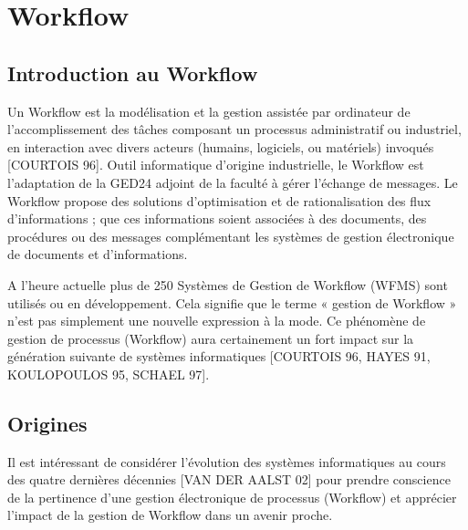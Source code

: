 
 \section{Workflow}
 	 
 	 \subsection{Introduction au Workflow }
 	 
 	 
 	 Un Workflow est la modélisation et la gestion assistée par ordinateur de l’accomplissement des tâches composant un processus administratif ou industriel, en interaction avec divers acteurs (humains, logiciels, ou matériels) invoqués [COURTOIS 96]. Outil informatique d’origine industrielle, le Workflow est l’adaptation de la GED24 adjoint de la faculté à gérer l’échange de messages. Le Workflow propose des solutions d’optimisation et de rationalisation des flux d’informations ; que ces informations soient associées à des documents, des procédures ou des messages complémentant les systèmes de gestion électronique de documents et d’informations.
 	 
 	 A l’heure actuelle plus de 250 Systèmes de Gestion de Workflow (WFMS) sont utilisés ou en développement. Cela signifie que le terme « gestion de Workflow » n’est pas simplement une nouvelle expression à la mode. Ce phénomène de gestion de processus (Workflow) aura certainement un fort impact sur la génération suivante de systèmes informatiques [COURTOIS 96, HAYES 91, KOULOPOULOS 95, SCHAEL 97].
 	 
 \subsection{Origines} 
 	 Il est intéressant de considérer l’évolution des systèmes informatiques au cours des quatre dernières décennies [VAN DER AALST 02] pour prendre conscience de la pertinence d’une gestion électronique de processus (Workflow) et apprécier l’impact de la gestion de Workflow dans un avenir proche.
 	 
